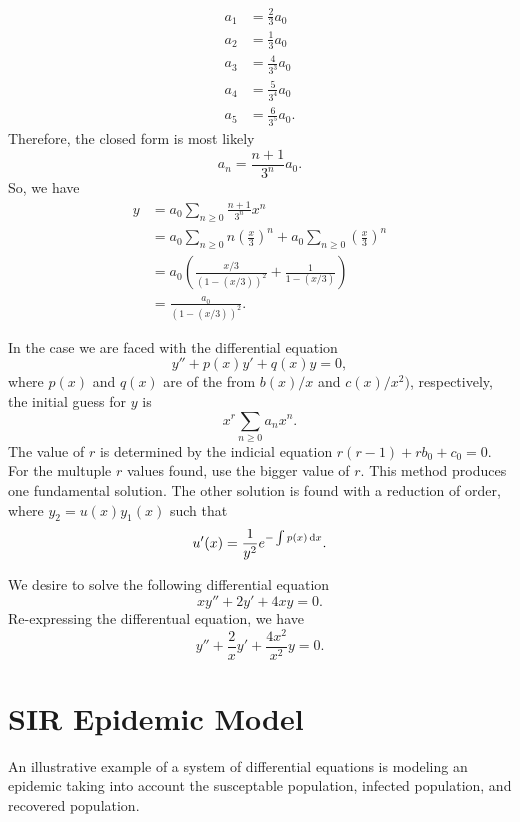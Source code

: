 \begin{align*}
    a_1 &= \frac{2}{3}a_0 \\
    a_2 &= \frac{1}{3}a_0 \\
    a_3 &= \frac{4}{3^3}a_0 \\
    a_4 &= \frac{5}{3^4}a_0 \\
    a_5 &= \frac{6}{3^5}a_0.
\end{align*}
Therefore, the closed form is most likely $$a_n = \frac{n+1}{3^n}a_0.$$ So,
we have 
\begin{align*}
    y &= a_0\sum_{n \geq 0} \frac{n+1}{3^n} x^n \\
      &= a_0 \sum_{n \geq 0} n \left(\frac{x}{3} \right)^n + a_0\sum_{n\geq 0} \left(\frac{x}{3}\right)^n \\
      &= a_0 \left(\frac{x/3}{(1-(x/3))^2}+\frac{1}{1-(x/3)} \right) \\
      &=\frac{a_0}{(1-(x/3))^2}.
\end{align*}

\begin{theorem}
    In the case we are faced with the differential equation
    $$y'' + p(x)y' + q(x)y = 0,$$ where $p(x)$ and $q(x)$ are of the
    from $b(x)/x$ and $c(x)/x^2)$, respectively, the initial guess for $y$
    is $$x^r \sum_{n \geq 0} a_n x^n.$$ The value of $r$ is determined by the
    indicial equation $r(r-1)+rb_0 + c_0 = 0$. For the multuple $r$ values
    found, use the bigger value of $r$. This method produces one fundamental
    solution. The other solution is found with a reduction of order, where
    $y_2=u(x)y_1(x)$ such that 
    $$u'(x) = \frac{1}{y^2}e^{-\int p(x) \dif x}.$$
\end{theorem}
\begin{example}
    We desire to solve the following differential equation
    $$xy''+2y'+4xy = 0.$$ Re-expressing the differentual equation, we have
    $$y'' + \frac{2}{x}y' + \frac{4x^2}{x^2}y = 0.$$
\end{example}
\section{SIR Epidemic Model}
An illustrative example of a system of differential equations is modeling an
epidemic taking into account the susceptable population, infected population, and
recovered population.\
